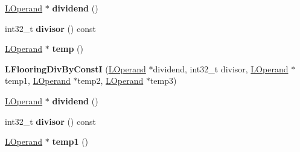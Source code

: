 \begin{DoxyCompactItemize}
\item 
\hyperlink{classv8_1_1internal_1_1_l_operand}{L\+Operand} $\ast$ {\bfseries dividend} ()\hypertarget{classv8_1_1internal_1_1_l_flooring_div_by_const_i_afd6eec483f06b84f2130f69d1bdb0663}{}\label{classv8_1_1internal_1_1_l_flooring_div_by_const_i_afd6eec483f06b84f2130f69d1bdb0663}

\item 
int32\+\_\+t {\bfseries divisor} () const \hypertarget{classv8_1_1internal_1_1_l_flooring_div_by_const_i_af9d8b07c5bf6feee1c070b62089c5bd2}{}\label{classv8_1_1internal_1_1_l_flooring_div_by_const_i_af9d8b07c5bf6feee1c070b62089c5bd2}

\item 
\hyperlink{classv8_1_1internal_1_1_l_operand}{L\+Operand} $\ast$ {\bfseries temp} ()\hypertarget{classv8_1_1internal_1_1_l_flooring_div_by_const_i_afcfe0e19c33badfb035d72c047c00aa7}{}\label{classv8_1_1internal_1_1_l_flooring_div_by_const_i_afcfe0e19c33badfb035d72c047c00aa7}

\item 
{\bfseries L\+Flooring\+Div\+By\+ConstI} (\hyperlink{classv8_1_1internal_1_1_l_operand}{L\+Operand} $\ast$dividend, int32\+\_\+t divisor, \hyperlink{classv8_1_1internal_1_1_l_operand}{L\+Operand} $\ast$temp1, \hyperlink{classv8_1_1internal_1_1_l_operand}{L\+Operand} $\ast$temp2, \hyperlink{classv8_1_1internal_1_1_l_operand}{L\+Operand} $\ast$temp3)\hypertarget{classv8_1_1internal_1_1_l_flooring_div_by_const_i_a4bad6bad2a160ec580ee294ea5f5f221}{}\label{classv8_1_1internal_1_1_l_flooring_div_by_const_i_a4bad6bad2a160ec580ee294ea5f5f221}

\item 
\hyperlink{classv8_1_1internal_1_1_l_operand}{L\+Operand} $\ast$ {\bfseries dividend} ()\hypertarget{classv8_1_1internal_1_1_l_flooring_div_by_const_i_afd6eec483f06b84f2130f69d1bdb0663}{}\label{classv8_1_1internal_1_1_l_flooring_div_by_const_i_afd6eec483f06b84f2130f69d1bdb0663}

\item 
int32\+\_\+t {\bfseries divisor} () const \hypertarget{classv8_1_1internal_1_1_l_flooring_div_by_const_i_af9d8b07c5bf6feee1c070b62089c5bd2}{}\label{classv8_1_1internal_1_1_l_flooring_div_by_const_i_af9d8b07c5bf6feee1c070b62089c5bd2}

\item 
\hyperlink{classv8_1_1internal_1_1_l_operand}{L\+Operand} $\ast$ {\bfseries temp1} ()\hypertarget{classv8_1_1internal_1_1_l_flooring_div_by_const_i_ad723ce4b2d2a5fc051973689dc5f0fa0}{}\label{classv8_1_1internal_1_1_l_flooring_div_by_const_i_ad723ce4b2d2a5fc051973689dc5f0fa0}


\end{DoxyCompactItemize}
